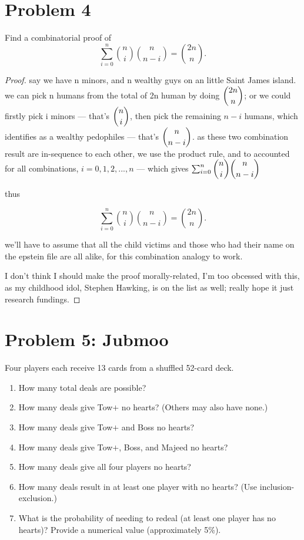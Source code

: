 \section*{Problem 4}
Find a combinatorial proof of
\[
\sum_{i=0}^n \binom{n}{i}\binom{n}{n-i} = \binom{2n}{n}.
\]

\medskip
\solution

\begin{proof}
say we have n minors, and n wealthy guys on an little Saint James island. we can pick n humans from the total of 2n human by doing $\dbinom{2n}{n}$; or we could firstly pick i minors --- that's $\dbinom{n}{i}$, then pick the remaining $n - i$ humans, which identifies as a wealthy pedophiles --- that's $\dbinom{n}{n-i}$. as these two combination result are in-sequence to each other, we use the product rule, and to accounted for all combinations, $i = 0, 1, 2, ..., n$ --- which gives $\sum_{i=0}^{n} \dbinom{n}{i} \dbinom{n}{n-i}$

thus 

\[
\sum_{i=0}^n \binom{n}{i}\binom{n}{n-i} = \binom{2n}{n}.
\]

\remark we'll have to assume that all the child victims and those who had their name on the epstein file are all alike, for this combination analogy to work. 

\remark I don't think I should make the proof morally-related, I'm too obcessed with this, as my childhood idol, Stephen Hawking, is on the list as well; really hope it just research fundings. 

\end{proof}

\vspace{1em}
\hrulefill

\section*{Problem 5: Jubmoo}
Four players each receive 13 cards from a shuffled 52-card deck.
\begin{enumerate}[label=\arabic*.]
    \item How many total deals are possible?
    \item How many deals give Tow$+$ no hearts? (Others may also have none.)
    \item How many deals give Tow$+$ and Boss no hearts?
    \item How many deals give Tow$+$, Boss, and Majeed no hearts?
    \item How many deals give all four players no hearts?
    \item How many deals result in at least one player with no hearts? (Use inclusion-exclusion.)
    \item What is the probability of needing to redeal (at least one player has no hearts)? Provide a numerical value (approximately 5\%). 
\end{enumerate}


